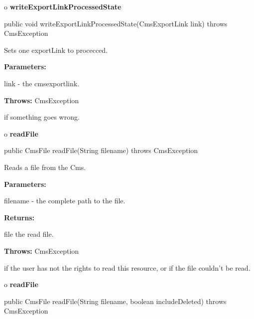 o {\bf writeExportLinkProcessedState} 

\begin{PRE}
 public void writeExportLinkProcessedState(CmsExportLink link) throws CmsException
\end{PRE}

\begin{description}
\htmlDD Sets one exportLink to procecced. 

\begin{description}
\item {\bf Parameters:}  

link - the cmsexportlink.  
\item {\bf Throws:} CmsException  

if something goes wrong.  
\end{description}

\end{description}

o {\bf readFile} 

\begin{PRE}
 public CmsFile readFile(String filename) throws CmsException
\end{PRE}

\begin{description}
\htmlDD Reads a file from the Cms. 

\begin{description}
\item {\bf Parameters:}  

filename - the complete path to the file.  
\item {\bf Returns:}  

file the read file.  
\item {\bf Throws:} CmsException  

if the user has not the rights to read this resource, or if the file couldn't
be read.  
\end{description}

\end{description}

o {\bf readFile} 

\begin{PRE}
 public CmsFile readFile(String filename,
                         boolean includeDeleted) throws CmsException
\end{PRE}

